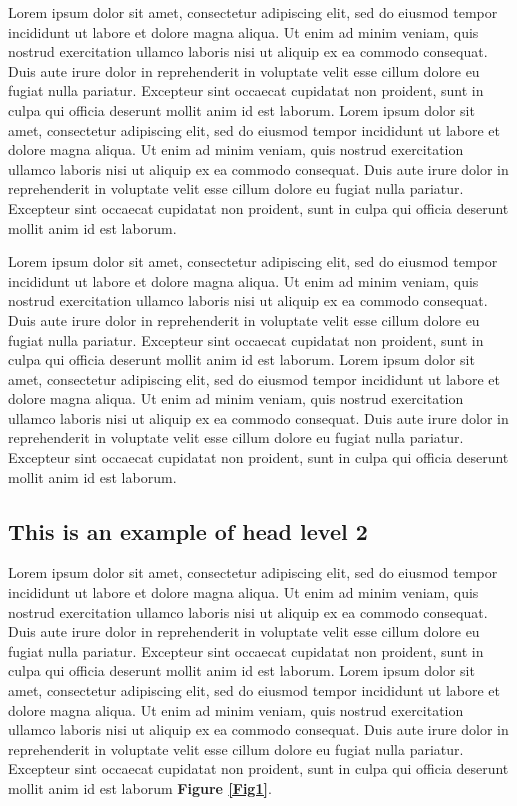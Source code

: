 \documentclass[english]{sbc2025}%
\begin{document}
Lorem ipsum dolor sit amet, consectetur adipiscing elit, sed do eiusmod tempor incididunt ut labore et dolore magna aliqua. Ut enim ad minim veniam, quis nostrud exercitation ullamco laboris nisi ut aliquip ex ea commodo consequat. Duis aute irure dolor in reprehenderit in voluptate velit esse cillum dolore eu fugiat nulla pariatur. Excepteur sint occaecat cupidatat non proident, sunt in culpa qui officia deserunt mollit anim id est laborum. Lorem ipsum dolor sit amet, consectetur adipiscing elit, sed do eiusmod tempor incididunt ut labore et dolore magna aliqua. Ut enim ad minim veniam, quis nostrud exercitation ullamco laboris nisi ut aliquip ex ea commodo consequat. Duis aute irure dolor in reprehenderit in voluptate velit esse cillum dolore eu fugiat nulla pariatur. Excepteur sint occaecat cupidatat non proident, sunt in culpa qui officia deserunt mollit anim id est laborum.

Lorem ipsum dolor sit amet, consectetur adipiscing elit, sed do eiusmod tempor incididunt ut labore et dolore magna aliqua. Ut enim ad minim veniam, quis nostrud exercitation ullamco laboris nisi ut aliquip ex ea commodo consequat. Duis aute irure dolor in reprehenderit in voluptate velit esse cillum dolore eu fugiat nulla pariatur. Excepteur sint occaecat cupidatat non proident, sunt in culpa qui officia deserunt mollit anim id est laborum. Lorem ipsum dolor sit amet, consectetur adipiscing elit, sed do eiusmod tempor incididunt ut labore et dolore magna aliqua. Ut enim ad minim veniam, quis nostrud exercitation ullamco laboris nisi ut aliquip ex ea commodo consequat. Duis aute irure dolor in reprehenderit in voluptate velit esse cillum dolore eu fugiat nulla pariatur. Excepteur sint occaecat cupidatat non proident, sunt in culpa qui officia deserunt mollit anim id est laborum.


\subsection{This is an example of head level 2}

Lorem ipsum dolor sit amet, consectetur adipiscing elit, sed do eiusmod tempor incididunt ut labore et dolore magna aliqua. Ut enim ad minim veniam, quis nostrud exercitation ullamco laboris nisi ut aliquip ex ea commodo consequat. Duis aute irure dolor in reprehenderit in voluptate velit esse cillum dolore eu fugiat nulla pariatur. Excepteur sint occaecat cupidatat non proident, sunt in culpa qui officia deserunt mollit anim id est laborum. Lorem ipsum dolor sit amet, consectetur adipiscing elit, sed do eiusmod tempor incididunt ut labore et dolore magna aliqua. Ut enim ad minim veniam, quis nostrud exercitation ullamco laboris nisi ut aliquip ex ea commodo consequat. Duis aute irure dolor in reprehenderit in voluptate velit esse cillum dolore eu fugiat nulla pariatur. Excepteur sint occaecat cupidatat non proident, sunt in culpa qui officia deserunt mollit anim id est laborum \textbf{Figure \ref{Fig1}}.
\end{document}
